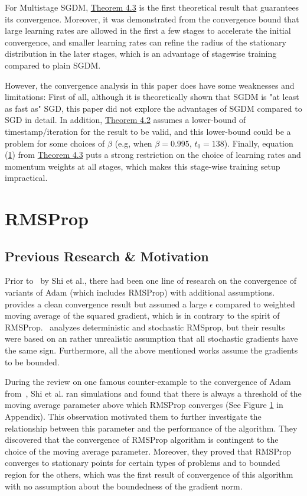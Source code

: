 \documentclass{article}
\begin{document}
For Multistage SGDM, \hyperref[theom42]{Theorem 4.3} is the first theoretical result that guarantees its convergence. Moreover, it was demonstrated from the convergence bound that large learning rates are allowed in the first a few stages to accelerate the initial convergence, and smaller learning rates can refine the radius of the stationary distribution in the later stages, which is an advantage of stagewise training compared to plain SGDM.

However, the convergence analysis in this paper does have some weaknesses and limitations: First of all, although it is theoretically shown that SGDM is "at least as fast as" SGD, this paper did not explore the advantages of SGDM compared to SGD in detail. In addition, \hyperref[theom42]{Theorem 4.2} assumes a lower-bound of timestamp/iteration for the result to be valid, and this lower-bound could be a problem for some choices of $\beta$ (e.g, when $\beta = 0.995$, $t_0 = 138$). Finally, equation (\hyperref[eq41]{1}) from \hyperref[theom43]{Theorem 4.3} puts a strong restriction on the choice of learning rates and momentum weights at all stages, which makes this stage-wise training setup impractical.
\section{RMSProp}
\label{section6}
\setcounter{equation}{0}
\subsection{Previous Research \& Motivation}
Prior to~\cite{shi2021rmsprop} by Shi et al., there had been one line of research on the convergence of variants of Adam (which includes RMSProp) with additional assumptions.~\cite{https://doi.org/10.48550/arxiv.2003.02395} provides a clean convergence result but assumed a large $\epsilon$ compared to  weighted moving average of the squared gradient, which is in contrary to the spirit of RMSProp.~\cite{https://doi.org/10.48550/arxiv.1807.06766} analyzes deterministic and stochastic RMSprop, but their results were based on an rather unrealistic assumption that all stochastic gradients have the same sign. Furthermore, all the above mentioned works assume the gradients to be bounded.

During the review on one famous counter-example to the convergence of Adam from~\cite{https://doi.org/10.48550/arxiv.1904.09237}, Shi et al. ran simulations and found that there is always a threshold of the moving average parameter above which
RMSProp converges (See Figure \hyperref[fig1]{1} in Appendix). This observation motivated them to further investigate the relationship between this parameter and the performance of the algorithm. They discovered that the convergence of RMSProp algorithm is
contingent to the choice of the moving average parameter. Moreover, they proved that RMSProp converges to stationary points for certain types of problems and to bounded region for the others, which was the first result of convergence
of this algorithm with no assumption about the boundedness of the gradient norm.
\end{document}

